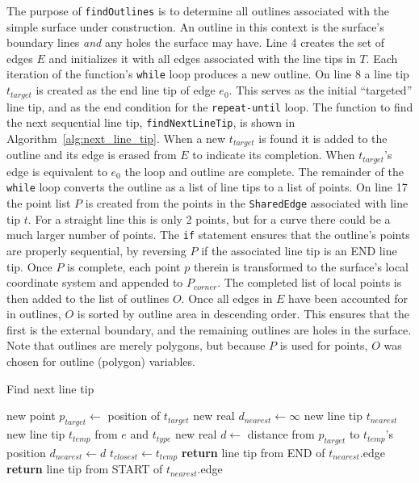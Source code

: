 The purpose of \verb|findOutlines| is to determine all outlines associated with the simple surface under construction.
An outline in this context is the surface's boundary lines \textit{and} any holes the surface may have.
Line 4 creates the set of edges $E$ and initializes it with all edges associated with the line tips in $T$.
Each iteration of the function's \verb|while| loop produces a new outline.
On line 8 a line tip $t_{target}$ is created as the end line tip of edge $e_0$.
This serves as the initial ``targeted'' line tip, and as the end condition for the \verb|repeat-until| loop.
The function to find the next sequential line tip, \verb|findNextLineTip|, is shown in Algorithm~\ref{alg:next_line_tip}.
When a new $t_{target}$ is found it is added to the outline and its edge is erased from $E$ to indicate its completion.
When $t_{target}$'s edge is equivalent to $e_0$ the loop and outline are complete.
The remainder of the \verb|while| loop converts the outline as a list of line tips to a list of points.
On line 17 the point list $P$ is created from the points in the \verb|SharedEdge| associated with line tip $t$.
For a straight line this is only 2 points, but for a curve there could be a much larger number of points.
The \verb|if| statement ensures that the outline's points are properly sequential, by reversing $P$ if the associated line tip is an END line tip.
Once $P$ is complete, each point $p$ therein is transformed to the surface's local coordinate system and appended to $P_{corner}$.
The completed list of local points is then added to the list of outlines $O$.
Once all edges in $E$ have been accounted for in outlines, $O$ is sorted by outline area in descending order.
This ensures that the first is the external boundary, and the remaining outlines are holes in the surface.
Note that outlines are merely polygons, but because $P$ is used for points, $O$ was chosen for outline (polygon) variables.

\begin{algorithm}[htb]
	\caption{Find next line tip}\label{alg:next_line_tip}
\begin{algorithmic}[1]
	\State new point $p_{target} \leftarrow$ position of $t_{target}$
	\State new real $d_{nearest} \leftarrow \infty$
	\State new line tip $t_{nearest}$
			\State new line tip $t_{temp}$ from $e$ and $t_{type}$
			\State new real $d \leftarrow$ distance from $p_{target}$ to $t_{temp}$'s position
				\State $d_{nearest} \leftarrow d$
				\State $t_{closest} \leftarrow t_{temp}$
			\EndIf
		\EndFor
	\EndFor
		\State \textbf{return} line tip from END of $t_{nearest}$.edge
	\Else
		\State \textbf{return} line tip from START of $t_{nearest}$.edge
	\EndIf
\EndFunction
\end{algorithmic}
\end{algorithm}


